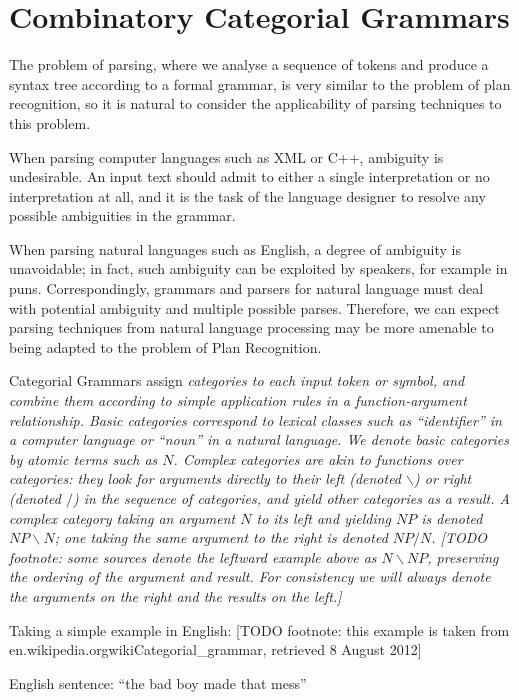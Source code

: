 \section{Combinatory Categorial Grammars}

The problem of parsing, where we analyse a sequence of tokens and produce a syntax tree according to a formal grammar, is very similar to the problem of plan recognition, so it is natural to consider the applicability of parsing techniques to this problem.

When parsing computer languages such as XML or C++, ambiguity is undesirable. An input text should admit to either a single interpretation or no interpretation at all, and it is the task of the language designer to resolve any possible ambiguities in the grammar.

When parsing natural languages such as English, a degree of ambiguity is unavoidable; in fact, such ambiguity can be exploited by speakers, for example in puns. Correspondingly, grammars and parsers for natural language must deal with potential ambiguity and multiple possible parses. Therefore, we can expect parsing techniques from natural language processing may be more amenable to being adapted to the problem of Plan Recognition.

Categorial Grammars assign \em{categories} to each input token or symbol, and combine them according to simple application rules in a function-argument relationship. \em{Basic} categories correspond to lexical classes such as ``identifier'' in a computer language or ``noun'' in a natural language. We denote basic categories by atomic terms such as $N$. \em{Complex} categories are akin to functions over categories: they look for arguments directly to their left (denoted $\backslash$) or right (denoted $/$) in the sequence of categories, and yield other categories as a result. A complex category taking an argument $N$ to its left and yielding $NP$ is denoted $NP\backslash N$; one taking the same argument to the right is denoted $NP/N$. [TODO footnote: some sources denote the leftward example above as $N\backslash NP$, preserving the ordering of the argument and result. For consistency we will always denote the arguments on the right and the results on the left.]

Taking a simple example in English: [TODO footnote: this example is taken from en.wikipedia.org\/wiki\/Categorial\_grammar, retrieved 8 August 2012]

English sentence: ``the bad boy made that mess''

